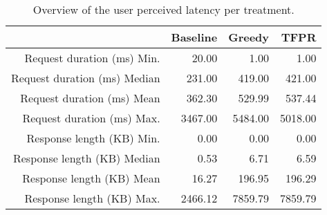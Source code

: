 \begin{table}[ht]
\centering
\begin{tabular}{rrrr}
  \hline
 & Baseline & Greedy & TFPR \\ 
  \hline
Request duration (ms) Min. & 20.00 & 1.00 & 1.00 \\ 
  Request duration (ms) Median & 231.00 & 419.00 & 421.00 \\ 
  Request duration (ms) Mean & 362.30 & 529.99 & 537.44 \\ 
  Request duration (ms) Max. & 3467.00 & 5484.00 & 5018.00 \\ 
  Response length (KB) Min. & 0.00 & 0.00 & 0.00 \\ 
  Response length (KB) Median & 0.53 & 6.71 & 6.59 \\ 
  Response length (KB) Mean & 16.27 & 196.95 & 196.29 \\ 
  Response length (KB) Max. & 2466.12 & 7859.79 & 7859.79 \\ 
   \hline
\end{tabular}
\caption{Overview of the user perceived latency per treatment.} 
\label{tab:results:rq2:summary:treatment}
\end{table}
